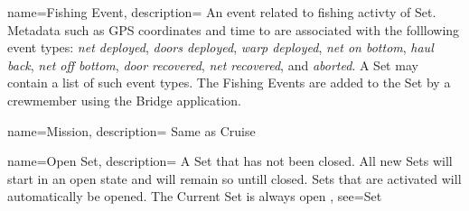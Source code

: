


 {
    name=Fishing Event,
    description={
        An event related to fishing activty of \gls{Set}.
        Metadata such as GPS coordinates and time to are associated with the folllowing event types:
        \emph{net deployed},
        \emph{doors deployed},
        \emph{warp deployed},
        \emph{net on bottom},
        \emph{haul back},
        \emph{net off bottom},
        \emph{door recovered},
        \emph{net recovered},
        and \emph{aborted}.
        A \gls{Set} may contain a list of such event types.
        The Fishing Events are added to the \gls{Set} by a crewmember using the \gls{Bridge} application.
    }
}








 {
    name=Mission,
    description={
        Same as \gls{Cruise}
    }
}

 {
    name=Open Set,
    description={
        A \gls{Set} that has not been closed. All new Sets will start in an open state and will remain so untill closed.
        Sets that are activated will automatically be opened.
        The \gls{Current Set} is always open
    },
    see={Set}
}


